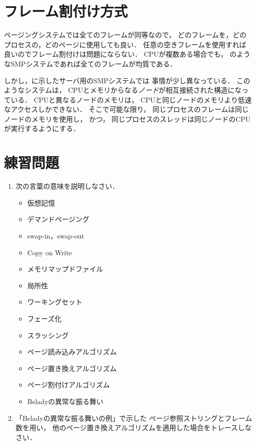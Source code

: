 \section{フレーム割付け方式}\label{frameAllocation}
ページングシステムでは全てのフレームが同等なので，
どのフレームを，どのプロセスの，どのページに使用しても良い．
任意の空きフレームを使用すれば良いのでフレーム割付けは問題にならない．
CPUが複数ある場合でも，
のようなSMPシステムであれば全てのフレームが均質である．

しかし，に示したサーバ用のSMPシステムでは
事情が少し異なっている．
このようなシステムは，
CPUとメモリからなる\emph{ノード}が相互接続された構造になっている．
CPUと異なるノードのメモリは，
CPUと同じノードのメモリより低速なアクセスしかできない．
そこで可能な限り，
同じプロセスのフレームは同じノードのメモリを使用し，
かつ，
同じプロセスのスレッドは同じノードのCPUが実行するようにする．

\section*{練習問題}
\begin{enumerate}
  \renewcommand{\labelenumi}{\ttfamily\arabic{chapter}.\arabic{enumi}}
  \setlength{\leftskip}{1em}
\item 次の言葉の意味を説明しなさい．
  \begin{itemize}
  \item 仮想記憶
  \item デマンドページング
  \item swap-in，swap-out
  \item Copy on Write
  \item メモリマップドファイル
  \item 局所性
  \item ワーキングセット
  \item フェーズ化
  \item スラッシング
  \item ページ読み込みアルゴリズム
  \item ページ置き換えアルゴリズム
  \item ページ割付けアルゴリズム
  \item Beladyの異常な振る舞い
  \end{itemize}
\item 「Beladyの異常な振る舞いの例」で示した
  ページ参照ストリングとフレーム数を用い，
  他のページ置き換えアルゴリズムを適用した場合をトレースしなさい．
\end{enumerate}
